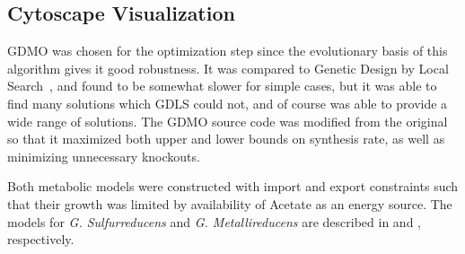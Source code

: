 \documentclass[a4paper,twocolumn]{article}
\begin{document}
\subsection{Cytoscape Visualization}

GDMO was chosen for the optimization step since the evolutionary basis of this algorithm gives it good robustness. It was compared to Genetic Design by Local Search~\cite{Lun2009}, and found to be somewhat slower for simple cases, but it was able to find many solutions which GDLS could not, and of course was able to provide a wide range of solutions. The GDMO source code was modified from the original so that it maximized both upper and lower bounds on synthesis rate, as well as minimizing unnecessary knockouts.

Both metabolic models were constructed with import and export constraints such that their growth was limited by availability of Acetate as an energy source. The models for {\it G. Sulfurreducens} and {\it G. Metallireducens }are described in \cite{Mahadevan2006} and \cite{Sun2009}, respectively.


\nocite{R-base,R-ggplot2,R-RCytoscape}



\end{document}
